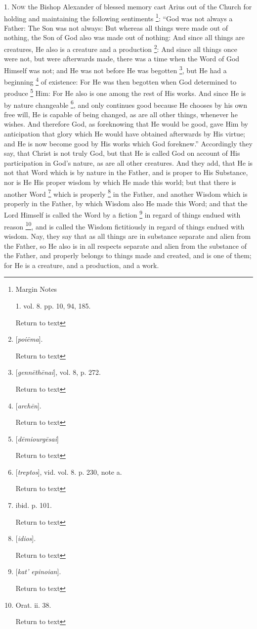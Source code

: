 1. N\textsc{ow} the Bishop Alexander
of blessed memory cast Arius out of the Church for holding and
maintaining the following sentiments \footnote{Margin Notes

1. vol. 8. pp. 10, 94, 185.

Return to text}: ``God
was not always a Father: The Son was not always: But whereas all
things were made out of nothing, the Son of God also was made out of
nothing: And since all things are creatures, He also is a creature and
a production \footnote{[\emph{poi\={e}ma}].

Return to text}: And since all things
once were not, but were afterwards made, there was a time when the
Word of God Himself was not; and He was not before He was begotten \footnote{[\emph{genn\={e}th\={e}nai}], vol. 8, p. 272.

Return to text}, but He had a beginning \footnote{[\emph{arch\={e}n}].

Return to text} of
existence: For He was then begotten when God determined to produce \footnote{[\emph{d\={e}miourg\={e}sai}]

Return to text} Him: For He also is one among the rest of His works. And since He
is by nature changeable \footnote{[\emph{treptos}], vid. vol. 8. p. 230, note a.

Return to text}, and only
continues good because He chooses by his own free will, He is capable
of being changed, as are all other things, whenever he wishes. And
therefore God, as foreknowing that He would be good, gave Him by
anticipation that glory which He would have obtained afterwards by His
virtue; and He is now become good by His works which God foreknew.''
Accordingly they say, that Christ is not truly God, but that He is
called God on account of His participation in God's nature, as are all
other creatures. And they add, that He is not that Word which is by
nature in the Father, and is proper to His Substance, nor is He His
proper wisdom by which He made this world; but that there is another
Word \footnote{ibid. p. 101.

Return to text} which is properly \footnote{[\emph{idios}].

Return to text} in the Father, and another Wisdom which is properly in the Father,
by which Wisdom also He made this Word; and that the Lord Himself is
called the Word by a fiction \footnote{[\emph{kat' epinoian}].

Return to text} in regard
of things endued with reason \footnote{Orat. ii. 38.

Return to text}, and is
called the Wisdom fictitiously in regard of things endued with wisdom.
Nay, they say that as all things are in substance separate and
alien from the Father, so He also is in all respects separate and
alien from the substance of the Father, and properly belongs to things
made and created, and is one of them; for He is a creature, and a
production, and a work.

